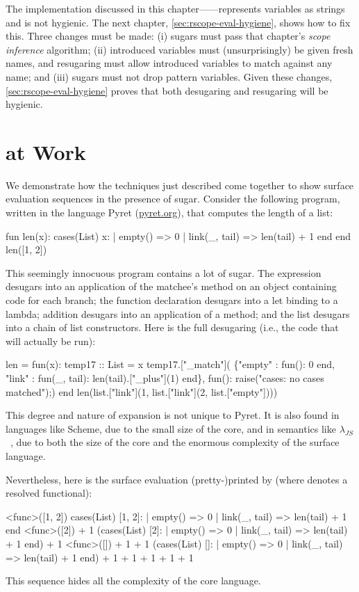 The implementation discussed in this
chapter---{\Resugarer}---represents variables as strings and is not
hygienic. The next chapter, \cref{sec:rscope-eval-hygiene}, shows how
to fix this. Three changes must be made: (i) sugars must pass that
chapter's \emph{scope inference} algorithm; (ii) introduced variables
must (unsurprisingly) be given fresh names, and resugaring must allow
introduced variables to match against any name; and (iii) sugars must
not drop pattern variables. Given these changes,
\cref{sec:rscope-eval-hygiene} proves that both desugaring and
resugaring will be hygienic.

\section{{\Resugarer} at Work}
\label{sec:reval-pyret-example}

We demonstrate how the techniques just described come together to show
surface evaluation sequences in the presence of sugar. Consider the
following program, written in the language Pyret (\url{pyret.org}), 
that computes the length of a list:
\begin{Codes}
    fun len(x):
      cases(List) x:
        | empty() => 0
        | link(_, tail) => len(tail) + 1
      end
    end
    len([1, 2])
\end{Codes}
This seemingly innocuous program contains a lot of sugar. The 
expression desugars into an application of the matchee's 
method on an object containing code for each branch; the function
declaration desugars into a let binding to a lambda; addition desugars
into an application of a  method; and the list \Code{[1, 2]}
desugars into a chain of list constructors. Here is the full desugaring
(i.e., the code that will actually be run):
\begin{Codes}
len = fun(x):
    temp17 :: List = x
    temp17.["_match"](
      \{"empty" : fun(): 0 end,
       "link" : fun(_, tail):
                len(tail).["_plus"](1) end\},
      fun(): raise("cases: no cases matched");)
    end
len(list.["link"](1, list.["link"](2, list.["empty"])))
\end{Codes}
This degree and nature of expansion is not unique to Pyret.
It is also found in languages like Scheme, due
to the small size of the core, and in semantics like
$\lambda_{JS}$~\cite{lambda-js},
due to both the size of the core and the enormous complexity
of the surface language.

Nevertheless, here is the surface evaluation (pretty-)printed by {\Resugarer} (where
 denotes a resolved functional):
\begin{Codes}
\SurfStep <func>([1, 2])
\SurfStep cases(List) [1, 2]:
      | empty() => 0
      | link(_, tail) => len(tail) + 1
    end
\SurfStep <func>([2]) + 1
\SurfStep (cases(List) [2]:
      | empty() => 0
      | link(_, tail) => len(tail) + 1
    end) + 1
\SurfStep <func>([]) + 1 + 1
\SurfStep (cases(List) []:
      | empty() => 0
      | link(_, tail) => len(tail) + 1
    end) + 1 + 1
 + 1 + 1
 + 1
\end{Codes}
This sequence hides all the complexity of the core language.


